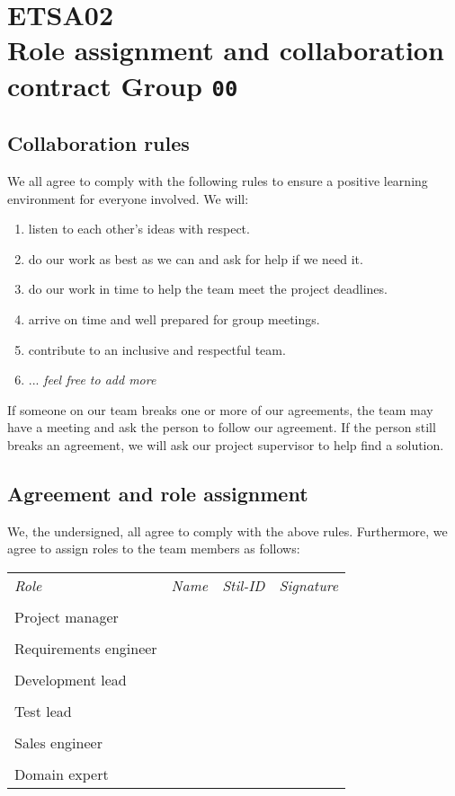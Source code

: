 \documentclass[12pt]{article}
\begin{document}
\clearpage\thispagestyle{empty}

\section*{ETSA02\\Role assignment and collaboration contract Group \texttt{00}}
\subsection*{Collaboration rules}
We all agree to comply with the following rules to ensure a positive learning environment for everyone involved. We will:
\begin{enumerate}
\item listen to each other's ideas with respect.
\item do our work as best as we can and ask for help if we need it.
\item do our work in time to help the team meet the project deadlines.
\item arrive on time and well prepared for group meetings.
\item contribute to an inclusive and respectful team.
\item ... \emph{feel free to add more}
\end{enumerate}

If someone on our team breaks one or more of our agreements, the team may have a meeting and ask the person to follow our agreement. If the person still breaks an agreement, we will ask our project supervisor to help find a solution.

\subsection*{Agreement and role assignment}
We, the undersigned, all agree to comply with the above rules. Furthermore, we agree to assign roles to the team members as follows:

\vspace{1em}

\begin{tabular}{l p{4cm} l p{4cm}}
\emph{Role} & \emph{Name} & \emph{Stil-ID} & \emph{Signature} \\
\\ Project manager & \dotfill & \dotfill & \dotfill \\
\\ Requirements engineer & \dotfill & \dotfill & \dotfill \\
\\ Development lead & \dotfill & \dotfill & \dotfill \\
\\ Test lead & \dotfill & \dotfill & \dotfill \\
\\ Sales engineer & \dotfill & \dotfill & \dotfill \\
\\ Domain expert & \dotfill & \dotfill & \dotfill \\
\end{tabular}
\end{document}
